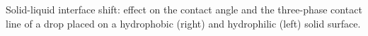 \label{fig:Interface-shift}Solid-liquid interface shift: effect
on the contact angle and the three-phase contact line of a drop placed
on a hydrophobic (right) and hydrophilic (left) solid surface.